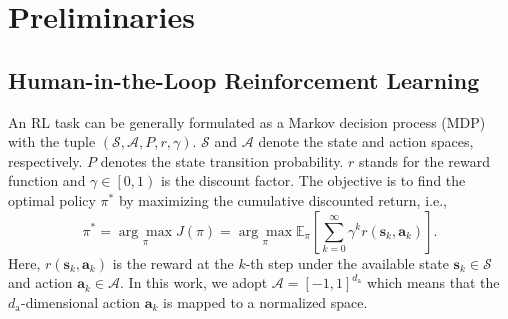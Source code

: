 \documentclass[9pt,journal]{IEEEtran}
\newcommand{\DOVE}{DOVE}
\newcommand{\Sset}{\mathcal{S}}
\newcommand{\A}{\mathcal{A}}
\newcommand{\E}{\mathbb{E}}
\newcommand{\ER}{\ensuremath{\mathrm{ER}}}
\newcommand{\va}{\bm{a}}
\newcommand{\vs}{\bm{s}}
\begin{document}








\section{Preliminaries}

\subsection{Human-in-the-Loop Reinforcement Learning }\label{sec:prelim_hitl}


An RL task can be generally formulated as a Markov decision process (MDP) with the tuple $\left(\Sset,\A,P,r,\gamma\right)$. 
$\Sset$ and $\A$ denote the state and action spaces, respectively. $P$ denotes the state transition probability. 
$r$ stands for the reward function and $\gamma\in\left[0,1\right)$ is the discount factor. 
The objective is to find the optimal policy $\pi^*$ by maximizing the cumulative discounted return, i.e.,
\begin{equation}
    \pi^* =  \underset{\pi}{\arg\max} J(\pi)
    =  \underset{\pi}{\arg\max} \E_{\pi}\!\left[\sum_{k=0}^{\infty}\gamma^{k}
    r\!\left(\vs_k,\va_k\right)\right].
    \label{eq:return}
\end{equation}
Here, $r(\vs_k, \va_k)$ is the reward at the $k$-th step under the available state $\vs_k\in\Sset$ and action $\va_k\in\A$. In this work, we adopt $\A=[-1,1]^{d_{\mathrm a}}$ which means that the $d_{\mathrm a}$-dimensional action $\va_k$ is mapped to a normalized space.
\end{document}
